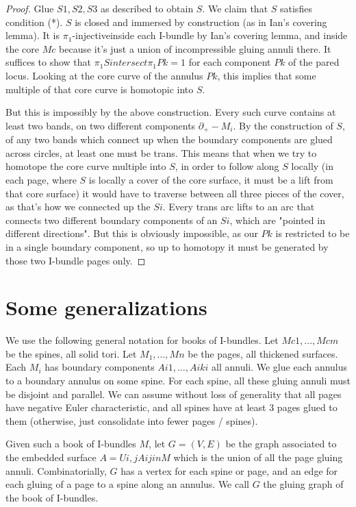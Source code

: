 \documentclass[12pt]{amsart}
\theoremstyle{definition}
\newcommand{\bd}{\partial}
\newcommand{\piinj}{$\pi_1$-injective}
\begin{document}
\begin{proof}
Glue $S1,S2,S3$ as described to obtain $S$. We claim that $S$ satisfies condition
(*). $S$ is closed and immersed by construction (as in Ian's covering lemma). It
is \piinj inside each I-bundle by Ian's covering lemma, and inside the
core $Mc$ because it's just a union of incompressible gluing annuli there. It
suffices to show that $\pi_1S intersect \pi_1Pk = 1$ for each component $Pk$ of the
pared locus. Looking at the core curve of the annulus $Pk$, this implies that
some multiple of that core curve is homotopic into $S$.

But this is impossibly by the above construction. Every such curve contains at
least two bands, on two different components $\bd_+-M_i$. By the construction of
$S$,
of any two bands which connect up when the boundary components are glued across
circles, at least one must be trans. This means that when we try to homotope
the core curve multiple into $S$, in order to follow along $S$ locally (in each
page, where $S$ is locally a cover of the core surface, it must be a lift from
that core surface) it would have to traverse between all three pieces of the
cover, as that's how we connected up the $Si$. Every trans arc lifts to an arc
that connects two different boundary components of an $Si$, which are "pointed in
different directions". But this is obviously impossible, as our $Pk$ is
restricted to be in a single boundary component, so up to homotopy it must be
generated by those two I-bundle pages only.

\end{proof}

\section{Some generalizations}

We use the following general notation for books of I-bundles. Let $Mc1,...,Mcm$
be the spines, all solid tori. Let $M_1,...,Mn$ be the pages, all thickened
surfaces. Each $M_i$ has boundary components $Ai1,...,Aiki$ all annuli. We glue each
annulus to a boundary annulus on some spine. For each spine, all these gluing
annuli must be disjoint and parallel. We can assume without loss of generality
that all pages have negative Euler characteristic, and all spines have at least
3 pages glued to them (otherwise, just consolidate into fewer pages / spines).

Given such a book of I-bundles $M$, let $G=(V,E)$ be the graph associated to the
embedded surface $A = Ui,j Aij in M$ which is the union of all the page gluing
annuli. Combinatorially, $G$ has a vertex for each spine or page, and an edge for
each gluing of a page to a spine along an annulus. We call $G$ the gluing graph
of the book of I-bundles.
\end{document}

